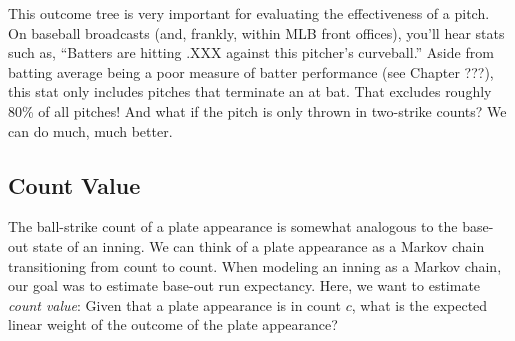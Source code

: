 \documentclass{article}
\begin{document}
  \begin{center}
  \end{center}

  This outcome tree is very important for evaluating the effectiveness of a pitch. On baseball broadcasts (and, frankly, within MLB front offices), you'll hear stats such as, ``Batters are hitting .XXX against this pitcher's curveball.'' Aside from batting average being a poor measure of batter performance (see Chapter ???), this stat only includes pitches that terminate an at bat. That excludes roughly 80\% of all pitches! And what if the pitch is only thrown in two-strike counts? We can do much, much better.

  \subsection{\sc Count Value}

    The ball-strike count of a plate appearance is somewhat analogous to the base-out state of an inning. We can think of a plate appearance as a Markov chain transitioning from count to count. When modeling an inning as a Markov chain, our goal was to estimate base-out run expectancy. Here, we want to estimate {\it count value}: Given that a plate appearance is in count $c$, what is the expected linear weight of the outcome of the plate appearance?
\end{document}
